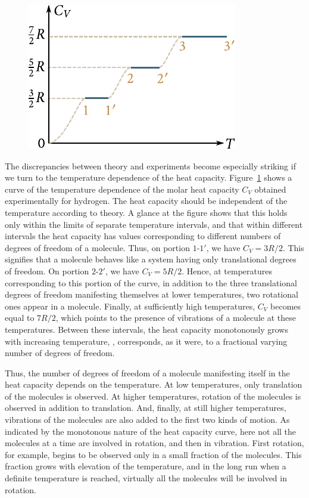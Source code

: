 \begin{figure}[t]
	\begin{center}
		\includegraphics[scale=1.0]{figures/ch_11/fig_11_13.pdf}
		\caption[]{}
		\label{fig:11_13}
	\end{center}
	\vspace{-0.8cm}
\end{figure}

The discrepancies between theory and experiments become especially striking if we turn to the temperature dependence of the heat capacity. Figure~\ref{fig:11_13} shows a curve of the temperature dependence of the molar heat capacity $C_V$ obtained experimentally for hydrogen. The heat capacity should be independent of the temperature according to theory. A glance at the figure shows that this holds only within the limits of separate temperature intervals, and that within different intervals the heat capacity has values corresponding to different numbers of degrees of freedom of a molecule. Thus, on portion $1$-$1'$, we have $C_V=3R/2$. This signifies that a molecule behaves like a system having only translational degrees of freedom. On portion $2$-$2'$, we have $C_V=5R/2$. Hence, at temperatures corresponding to this portion of the curve, in addition to the three translational degrees of freedom manifesting themselves at lower temperatures, two rotational ones appear in a molecule. Finally, at sufficiently high temperatures, $C_V$ becomes equal to $7R/2$, which points to the presence of vibrations of a molecule at these temperatures. Between these intervals, the heat capacity monotonously grows with increasing temperature, \ie, corresponds, as it were, to a fractional varying number of degrees of freedom.

Thus, the number of degrees of freedom of a molecule manifesting itself in the heat capacity depends on the temperature. At low temperatures, only translation of the molecules is observed. At higher temperatures, rotation of the molecules is observed in addition to translation. And, finally, at still higher temperatures, vibrations of the molecules are also added to the first two kinds of motion. As indicated by the monotonous nature of the heat capacity curve, here not all the molecules at a time are involved in rotation, and then in vibration. First rotation, for example, begins to be observed only in a small fraction of the molecules. This fraction grows with elevation of the temperature, and in the long run when a definite temperature is reached, virtually all the molecules will be involved in rotation.

